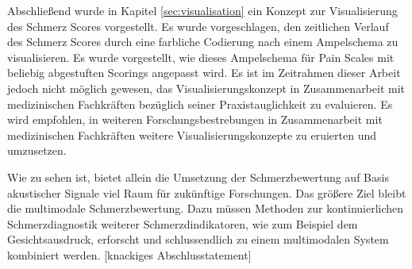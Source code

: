 Abschließend wurde in Kapitel \ref{sec:visualisation} ein Konzept zur Visualisierung des Schmerz Scores vorgestellt. Es wurde vorgeschlagen, den zeitlichen Verlauf des Schmerz Scores durch eine farbliche Codierung nach einem Ampelschema zu visualisieren. Es wurde vorgestellt, wie dieses Ampelschema für Pain Scales mit beliebig abgestuften Scorings angepasst wird. Es ist im Zeitrahmen dieser Arbeit jedoch nicht möglich gewesen, das Visualisierungskonzept in Zusammenarbeit mit medizinischen Fachkräften bezüglich seiner Praxistauglichkeit zu evaluieren. Es wird empfohlen, in weiteren Forschungsbestrebungen in Zusammenarbeit mit medizinischen Fachkräften weitere Visualisierungskonzepte zu eruierten und umzusetzen.

Wie zu sehen ist, bietet allein die Umsetzung der Schmerzbewertung auf Basis akustischer Signale viel Raum für zukünftige Forschungen. Das größere Ziel bleibt die multimodale Schmerzbewertung. Dazu müssen Methoden zur kontinuierlichen Schmerzdiagnostik weiterer Schmerzdindikatoren, wie zum Beispiel dem Gesichtsausdruck, erforscht und schlussendlich zu einem multimodalen System kombiniert werden. [knackiges Abschlusstatement]